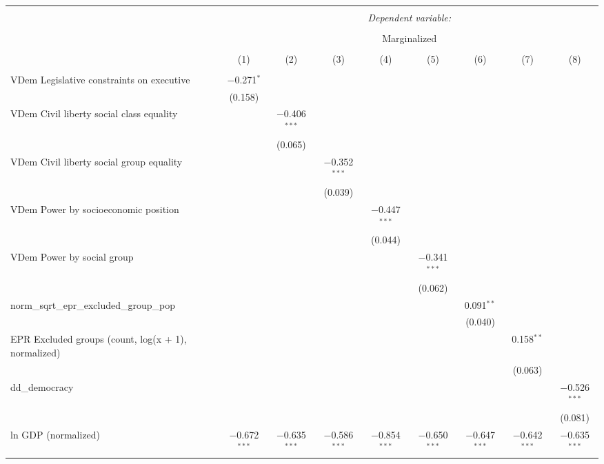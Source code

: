 
\begin{sidewaystable}[!htbp] \centering 
  \caption{} 
  \label{} 
\tiny 
\begin{tabular}{@{\extracolsep{5pt}}lcccccccc} 
\\[-1.8ex]\hline 
\hline \\[-1.8ex] 
 & \multicolumn{8}{c}{\textit{Dependent variable:}} \\ 
\cline{2-9} 
\\[-1.8ex] & \multicolumn{8}{c}{Marginalized} \\ 
\\[-1.8ex] & (1) & (2) & (3) & (4) & (5) & (6) & (7) & (8)\\ 
\hline \\[-1.8ex] 
 VDem Legislative constraints on executive & $-$0.271$^{*}$ &  &  &  &  &  &  &  \\ 
  & (0.158) &  &  &  &  &  &  &  \\ 
  VDem Civil liberty social class equality &  & $-$0.406$^{***}$ &  &  &  &  &  &  \\ 
  &  & (0.065) &  &  &  &  &  &  \\ 
  VDem Civil liberty social group equality &  &  & $-$0.352$^{***}$ &  &  &  &  &  \\ 
  &  &  & (0.039) &  &  &  &  &  \\ 
  VDem Power by socioeconomic position &  &  &  & $-$0.447$^{***}$ &  &  &  &  \\ 
  &  &  &  & (0.044) &  &  &  &  \\ 
  VDem Power by social group &  &  &  &  & $-$0.341$^{***}$ &  &  &  \\ 
  &  &  &  &  & (0.062) &  &  &  \\ 
  norm\_sqrt\_epr\_excluded\_group\_pop &  &  &  &  &  & 0.091$^{**}$ &  &  \\ 
  &  &  &  &  &  & (0.040) &  &  \\ 
  EPR Excluded groups (count, log(x + 1), normalized) &  &  &  &  &  &  & 0.158$^{**}$ &  \\ 
  &  &  &  &  &  &  & (0.063) &  \\ 
  dd\_democracy &  &  &  &  &  &  &  & $-$0.526$^{***}$ \\ 
  &  &  &  &  &  &  &  & (0.081) \\ 
  ln GDP (normalized) & $-$0.672$^{***}$ & $-$0.635$^{***}$ & $-$0.586$^{***}$ & $-$0.854$^{***}$ & $-$0.650$^{***}$ & $-$0.647$^{***}$ & $-$0.642$^{***}$ & $-$0.635$^{***}$ \\ 

\end{tabular}
\end{sidewaystable}
